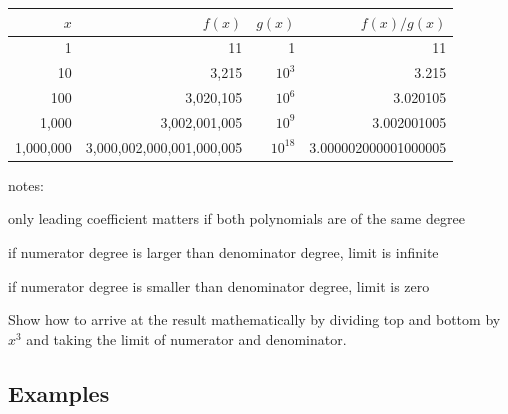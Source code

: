 \documentclass[letterpaper, landscape]{exam}
\begin{document}
  \begin{tabular}[H]{rrrr}
    \toprule
    $x$       & $f(x)$                    & $g(x)$    & $f(x)/g(x)$ \\
    \midrule
    1         & 11                        & 1         & 11\\
    10        & 3,215                     & $10^3$    & 3.215 \\
    100       & 3,020,105                 & $10^6$    & 3.020105 \\
    1,000     & 3,002,001,005             & $10^9$    & 3.002001005 \\
    1,000,000 & 3,000,002,000,001,000,005 & $10^{18}$ & 3.000002000001000005 \\
    \bottomrule
  \end{tabular}

  notes:
  \begin{itemize*}
    \item only leading coefficient matters if both polynomials are of the same degree
    \item if numerator degree is larger than denominator degree, limit is infinite
    \item if numerator degree is smaller than denominator degree, limit is zero
  \end{itemize*}

  Show how to arrive at the result mathematically by dividing top and bottom by $x^3$ and
  taking the limit of numerator and denominator.

  \subsection{Examples}
\end{document}
